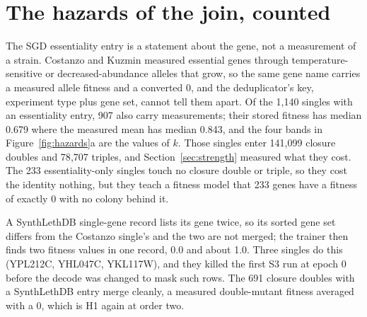 
\section{The hazards of the join, counted}
\label{sec:hazards}


\begin{table}[htbp]
\centering
\footnotesize
\caption{Records of the S3 pool touched by each hazard. Generated by
\texttt{s3\_closure\_recompute.py}.}
\label{tab:hazards}

\end{table}

The SGD essentiality entry is a statement about the gene, not a measurement of a
strain. Costanzo and Kuzmin measured essential genes through temperature-sensitive or
decreased-abundance alleles that grow, so the same gene name carries a measured
allele fitness and a converted 0, and the deduplicator's key, experiment type plus
gene set, cannot tell them apart. Of the 1{,}140 singles with an essentiality entry,
907 also carry measurements; their stored fitness has median 0.679 where the measured
mean has median 0.843, and the four bands in Figure~\ref{fig:hazards}a are the values
of $k$. Those singles enter 141{,}099 closure doubles and 78{,}707 triples, and
Section~\ref{sec:strength} measured what they cost. The 233 essentiality-only singles
touch no closure double or triple, so they cost the identity nothing, but they teach a
fitness model that 233 genes have a fitness of exactly 0 with no colony behind it.

A SynthLethDB single-gene record lists its gene twice, so its sorted gene set differs
from the Costanzo single's and the two are not merged; the trainer then finds two
fitness values in one record, 0.0 and about 1.0. Three singles do this (YPL212C,
YHL047C, YKL117W), and they killed the first S3 run at epoch 0 before the decode was
changed to mask such rows. The 691 closure doubles with a SynthLethDB entry merge
cleanly, a measured double-mutant fitness averaged with a 0, which is H1 again at
order two.

